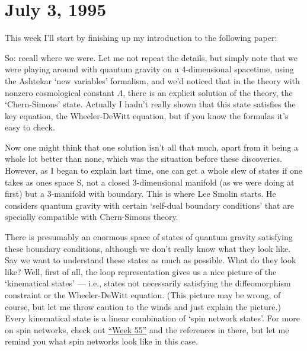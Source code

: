 \documentclass{article}
\def\tightlist{}
\renewcommand{\texttt}[1]{%
  \begingroup
  \ttfamily
  \begingroup\lccode`~=`/\lowercase{\endgroup\def~}{/\discretionary{}{}{}}%
  \begingroup\lccode`~=`[\lowercase{\endgroup\def~}{[\discretionary{}{}{}}%
  \begingroup\lccode`~=`.\lowercase{\endgroup\def~}{.\discretionary{}{}{}}%
  \catcode`/=\active\catcode`[=\active\catcode`.=\active
  \scantokens{#1\noexpand}%
  \endgroup
}
\begin{document}
\hypertarget{week57}{%
\section{July 3, 1995}\label{week57}}

This week I'll start by finishing up my introduction to the following
paper:


So: recall where we were. Let me not repeat the details, but simply note
that we were playing around with quantum gravity on a \(4\)-dimensional
spacetime, using the Ashtekar `new variables' formalism, and we'd
noticed that in the theory with nonzero cosmological constant
\(\Lambda\), there is an explicit solution of the theory, the
`Chern-Simons' state. Actually I hadn't really shown that this state
satisfies the key equation, the Wheeler-DeWitt equation, but if you know
the formulas it's easy to check.

Now one might think that one solution isn't all that much, apart from it
being a whole lot better than none, which was the situation before these
discoveries. However, as I began to explain last time, one can get a
whole slew of states if one takes as ones space S, not a closed
3-dimensional manifold (as we were doing at first) but a 3-manifold with
boundary. This is where Lee Smolin starts. He considers quantum gravity
with certain `self-dual boundary conditions' that are specially
compatible with Chern-Simons theory.

There is presumably an enormous space of states of quantum gravity
satisfying these boundary conditions, although we don't really know what
they look like. Say we want to understand these states as much as
possible. What do they look like? Well, first of all, the loop
representation gives us a nice picture of the `kinematical states' ---
i.e., states not necessarily satisfying the diffeomorphism constraint or
the Wheeler-DeWitt equation. (This picture may be wrong, of course, but
let me throw caution to the winds and just explain the picture.) Every
kinematical state is a linear combination of `spin network states'. For
more on spin networks, check out \protect\hyperlink{week55}{``Week 55''}
and the references in there, but let me remind you what spin networks
look like in this case.
\end{document}
